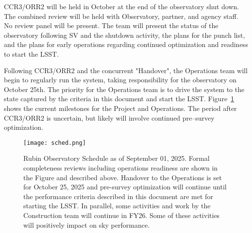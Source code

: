 CCR3/ORR2 will be held in October at the end of the observatory shut down. The combined review will be held with Observatory, partner, and agency staff. No review panel will be present. The team will present the status of the observatory following SV and the shutdown activity, the plans for the punch list, and the plans for early operations regarding continued optimization and readiness to start the LSST.

Following CCR3/ORR2 and the concurrent "Handover", the Operations team will begin to regularly run the system, taking responsibility for the observatory on October 25th. The priority for the Operations team is to drive the system to the state captured by the criteria in this document and start the LSST. Figure~\ref{sched} shows the current milestones for the Project and Operations. The period after CCR3/ORR2 is uncertain, but likely will involve continued pre--survey optimization. 

\begin{figure}%
  \centering
\texttt{[image: sched.png]}
\caption{Rubin Observatory Schedule as of September 01, 2025. Formal completeness reviews including operations readiness are shown in the Figure and described above. Handover to the Operations is set for October 25, 2025 and pre-survey optimization will continue until the performance criteria described in this document are met for starting the LSST. In parallel, some activities and work by the Construction team will continue in FY26. Some of these activities will positively impact on sky performance. }
\label{sched}
\end{figure}
